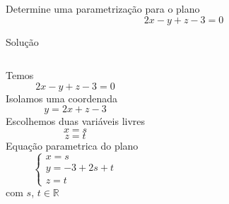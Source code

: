 \begin{question}
  Determine uma parametrização para o plano
  \[
    2x - y + z - 3 = 0
  \]
\end{question}

\begin{resolution}{Solução}
\begin{columns}[t]
  Temos
  \[
    2x-y+z-3=0
  \]
  \pause
  Isolamos uma coordenada
  \[
    y=2x+z-3
  \]
  \pause
  Escolhemos duas variáveis livres
  \[
    x = s
  \]
  \[
    z = t
  \]
  \pause
  Equação parametrica do plano
  \[
    \begin{cases}
      x = s \\
      y = -3 +2s + t \\
      z = t
    \end{cases}
  \]
  com $s$, $t\in\mathbb{R}$
\end{columns}
\end{resolution}

\endinput
